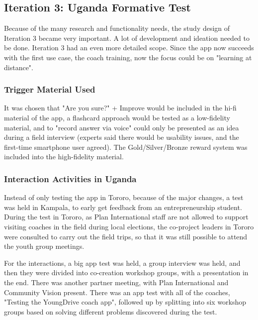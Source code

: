\subsection{Iteration 3: Uganda Formative Test}\label{sec:sd-3}

Because of the many research and functionality needs, the study design of Iteration 3 became very important. A lot of development and ideation needed to be done. Iteration 3 had an even more detailed scope. Since the app now succeeds with the first use case, the coach training, now the focus could be on "learning at distance".

\subsubsection{Trigger Material Used}
It was chosen that "Are you sure?" + Improve would be included in the hi-fi material of the app, a flashcard approach would be tested as a low-fidelity material, and to "record answer via voice" could only be presented as an idea during a field interview (experts said there would be usability issues, and the first-time smartphone user agreed). The Gold/Silver/Bronze reward system was included into the high-fidelity material.

\subsubsection{Interaction Activities in Uganda}
Instead of only testing the app in Tororo, because of the major changes, a test was held in Kampala, to early get feedback from an entrepreneurship student. During the test in Tororo, as Plan International staff are not allowed to support visiting coaches in the field during local elections, the co-project leaders in Tororo were consulted to carry out the field trips, so that it was still possible to attend the youth group meetings.

For the interactions, a big app test was held, a group interview was held, and then they were divided into co-creation workshop groups, with a presentation in the end. There was another partner meeting, with Plan International and Community Vision present. There was an app test with all of the coaches, "Testing the YoungDrive coach app", followed up by splitting into six workshop groups based on solving different problems discovered during the test.


